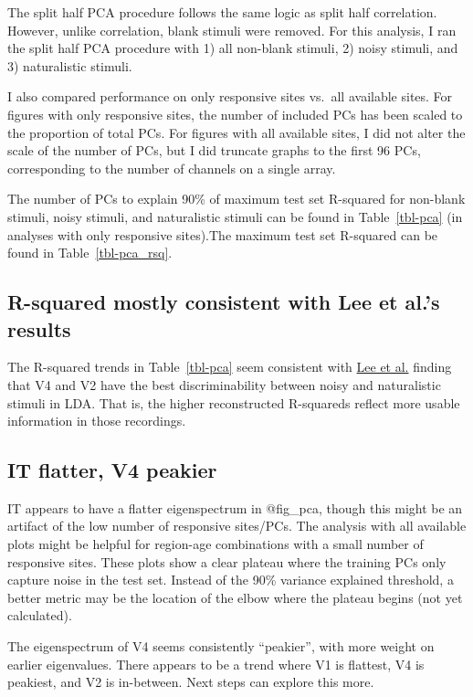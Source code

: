 \documentclass[
  10pt,
  letterpaper,
  DIV=11,
  numbers=noendperiod]{scrartcl}
\begin{document}
The split half PCA procedure follows the same logic as split half
correlation. However, unlike correlation, blank stimuli were removed.
For this analysis, I ran the split half PCA procedure with 1) all
non-blank stimuli, 2) noisy stimuli, and 3) naturalistic stimuli.

I also compared performance on only responsive sites vs.~all available
sites. For figures with only responsive sites, the number of included
PCs has been scaled to the proportion of total PCs. For figures with all
available sites, I did not alter the scale of the number of PCs, but I
did truncate graphs to the first 96 PCs, corresponding to the number of
channels on a single array.

The number of PCs to explain 90\% of maximum test set R-squared for
non-blank stimuli, noisy stimuli, and naturalistic stimuli can be found
in Table~\ref{tbl-pca} (in analyses with only responsive sites).The
maximum test set R-squared can be found in Table~\ref{tbl-pca_rsq}.

\subsection{R-squared mostly consistent with Lee et al.'s
results}\label{r-squared-mostly-consistent-with-lee-et-al.s-results}

The R-squared trends in Table~\ref{tbl-pca} seem consistent with
\href{https://doi.org/10.1016/j.celrep.2024.114534}{Lee et al.} finding
that V4 and V2 have the best discriminability between noisy and
naturalistic stimuli in LDA. That is, the higher reconstructed
R-squareds reflect more usable information in those recordings.

\subsection{IT flatter, V4 peakier}\label{it-flatter-v4-peakier}

IT appears to have a flatter eigenspectrum in @fig\_pca, though this
might be an artifact of the low number of responsive sites/PCs. The
analysis with all available plots might be helpful for region-age
combinations with a small number of responsive sites. These plots show a
clear plateau where the training PCs only capture noise in the test set.
Instead of the 90\% variance explained threshold, a better metric may be
the location of the elbow where the plateau begins (not yet calculated).

The eigenspectrum of V4 seems consistently ``peakier'', with more weight
on earlier eigenvalues. There appears to be a trend where V1 is
flattest, V4 is peakiest, and V2 is in-between. Next steps can explore
this more.
\end{document}
